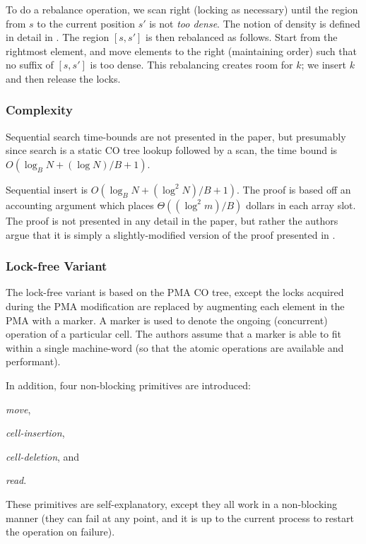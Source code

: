 \documentclass[preprint]{style}
\begin{document}
To do a rebalance operation, we scan right (locking as necessary) until the
region from $s$ to the current position $s'$ is not \textit{too dense}. The
notion of density is defined in detail in \cite{BenderFiGi05}. The region $[s,
s']$ is then rebalanced as follows. Start from the rightmost element, and move
elements to the right (maintaining order) such that no suffix of $[s, s']$ is
too dense. This rebalancing creates room for $k$; we insert $k$ and then
release the locks.

\subsubsection{Complexity}


Sequential search time-bounds are not presented in the paper, but presumably
since search is a static CO tree lookup followed by a scan, the time bound is
$O(\log_{B}{N} + ({\log{N}})/{B} + 1)$.

Sequential insert is $O(\log_{B}{N} + (\log^2{N})/{B} + 1)$. The proof is based
off an accounting argument which places $\Theta((\log^2{m})/B)$ dollars in each
array slot. The proof is not presented in any detail in the paper, but rather
the authors argue that it is simply a slightly-modified version of the proof
presented in \cite{Katriel02}.

\subsubsection{Lock-free Variant}

The lock-free variant is based on the PMA CO tree, except the locks acquired
during the PMA modification are replaced by augmenting each element in the PMA
with a marker. A marker is used to denote the ongoing (concurrent) operation of
a particular cell. The authors assume that a marker is able to fit within a
single machine-word (so that the atomic operations are available and
performant).

In addition, four non-blocking primitives are introduced:
\begin{inparaenum}[(a)]
  \item \textit{move},
  \item \textit{cell-insertion},
  \item \textit{cell-deletion}, and
  \item \textit{read}.
\end{inparaenum} These primitives are self-explanatory, except they
all work in a non-blocking manner (they can fail at any point, and it is
up to the current process to restart the operation on failure).
\end{document}
